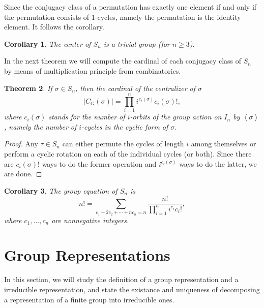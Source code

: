 \documentclass{assignment}[2019/10/15]
\newcommand{\lr}[3]{\left#1#3\right#2}
\theoremstyle{plain}
\newtheorem{theorem}{Theorem}[section]
\newtheorem{corollary}[theorem]{Corollary}
\begin{document}
    Since the conjugacy class of a permutation has exactly one element if and only if the permutation consists of 1-cycles, namely the permutation is the identity element. It follows the corollary.

    \begin{corollary}
        The center of $S_n$ is a trivial group (for $n \geq 3$).
    \end{corollary}

    In the next theorem we will compute the cardinal of each conjugacy class of $S_n$ by means of multiplication principle from combinatorics.

    \begin{theorem}
        If $\sigma\in S_n$, then the cardinal of the centralizer of $\sigma$
        \begin{equation}
            |C_G(\sigma)| = \prod_{i=1}^ni^{c_i(\sigma)}c_i(\sigma)!,
        \end{equation}
        where $c_i(\sigma)$ stands for the number of $i$-orbits of the group action on $I_n$ by $\lr<>\sigma$, namely the number of $i$-cycles in the cyclic form of $\sigma$.
    \end{theorem}

    \begin{proof}
        Any $\tau\in S_n$ can either permute the cycles of length $i$ among themselves or perform a cyclic rotation on each of the individual cycles (or both). Since there are $c_i(\sigma)!$ ways to do the former operation and $i^{c_i(\sigma)}$ ways to do the latter, we are done.
    \end{proof}

    \begin{corollary}
        The group equation of $S_n$ is
        \begin{equation}
            n! = \sum_{c_1+2c_2+\dotsb+nc_n=n}\frac{n!}{\prod_{i=1}^ni^{c_i}c_i!},
        \end{equation}
        where $c_1, \dotsc, c_n$ are nonnegative integers.
    \end{corollary}

    \section{Group Representations}

    In this section, we will study the definition of a group representation and a irreducible representation, and state the existance and uniqueness of decomposing a representation of a finite group into irreducible ones.
\end{document}
